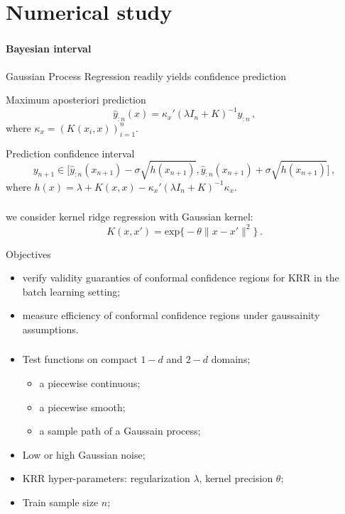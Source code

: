 \documentclass[t]{beamer}  %
\begin{document}


\section{Numerical study} %
\label{sec:Numerical_study}

\begin{frame}[c]\frametitle{\insertsection}
  \framesubtitle{Bayesian interval}
  Gaussian Process Regression readily yields confidence prediction
  \begin{block}{Maximum aposteriori prediction}
    $$ \hat{y}_{:n}(x) = \kappa_x' (\lambda I_n + K)^{-1} y_{:n} \,, $$
    where $\kappa_x = (K(x_i, x))_{i=1}^n$.
  \end{block}

  \begin{block}{Prediction confidence interval}
    $$ y_{n+1} \in
      \bigl[\hat{y}_{:n}(x_{n+1}) - \sigma \sqrt{h(x_{n+1})},
            \hat{y}_{:n}(x_{n+1}) + \sigma \sqrt{h(x_{n+1})} \bigr] \,, $$
    where $ h(x) = \lambda + K(x,x) - \kappa_x' (\lambda I_n + K)^{-1} \kappa_x$.
  \end{block}
\end{frame}

\begin{frame}[c]\frametitle{\insertsection}
  we consider kernel ridge regression with Gaussian kernel:
  $$ K(x,x') = \text{exp}\bigl\{ -\theta \|x-x'\|^2 \bigr\} \,. $$
  \begin{block}{Objectives}
    \begin{itemize}
      \item verify validity guaranties of conformal confidence regions for KRR in
      the batch learning setting;
      \item measure efficiency of conformal confidence regions under gaussainity
      assumptions.
    \end{itemize}
  \end{block}
\end{frame}

\begin{frame}[t]\frametitle{\insertsection}
  \begin{itemize}
    \item Test functions on compact $1-d$ and $2-d$ domains; \begin{itemize}
      \item a piecewise continuous;
      \item a piecewise smooth;
      \item a sample path of a Gaussain process;
    \end{itemize}
    \item Low or high Gaussian noise;
    \item KRR hyper-parameters: regularization $\lambda$, kernel precision $\theta$;
    \item Train sample size $n$;
  \end{itemize}
\end{frame}
\end{document}
